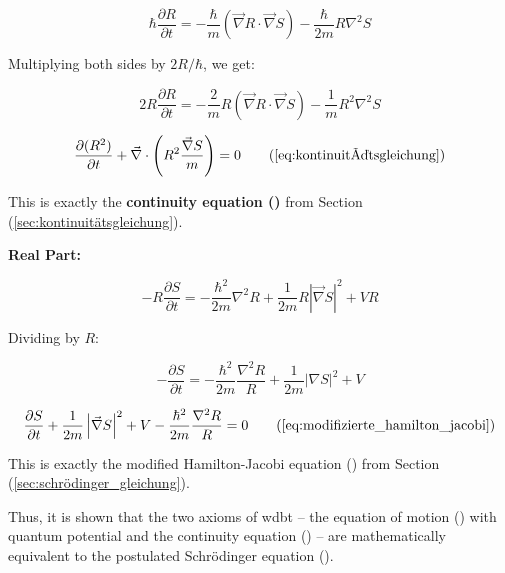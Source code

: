 \begin{equation}
    \hbar \frac{\partial R}{\partial t} = -\frac{\hbar}{m} (\vec{\nabla} R \cdot \vec{\nabla} S) - \frac{\hbar}{2m} R \nabla^2 S
\end{equation}

Multiplying both sides by $2R/\hbar$, we get:

\begin{equation}
    2R \frac{\partial R}{\partial t} = -\frac{2}{m} R (\vec{\nabla} R \cdot \vec{\nabla} S) - \frac{1}{m} R^2 \nabla^2 S
\end{equation}

\begin{equation}
    \frac{\partial (R^2)}{\partial t} + \vec{\nabla} \cdot \left( R^2 \frac{\vec{\nabla} S}{m} \right) = 0 \tag{\refeq{eq:kontinuitätsgleichung}}
\end{equation}

This is exactly the \textbf{continuity equation ()} from Section (\ref{sec:kontinuitätsgleichung}).

\textbf{Real Part:}

\begin{equation}
    - R \frac{\partial S}{\partial t} = -\frac{\hbar^2}{2m} \nabla^2 R + \frac{1}{2m} R \left| \vec{\nabla} S \right|^2 + V R
\end{equation}

Dividing by $R$:

\begin{equation}
    - \frac{\partial S}{\partial t} = -\frac{\hbar^2}{2m} \frac{\nabla^2 R}{R} + \frac{1}{2m} |\nabla S|^2 + V
\end{equation}

\begin{equation}
    \frac{\partial S}{\partial t} + \frac{1}{2m} \left| \vec{\nabla} S \right|^2 + V - \frac{\hbar^2}{2m} \frac{\nabla^2 R}{R} = 0 \tag{\refeq{eq:modifizierte_hamilton_jacobi}}
\end{equation}

This is exactly the modified Hamilton-Jacobi equation () from Section (\ref{sec:schrödinger_gleichung}).

Thus, it is shown that the two axioms of \gls{wdbt} – the equation of motion () with quantum potential and the continuity equation () – are mathematically equivalent to the postulated Schrödinger equation ().

